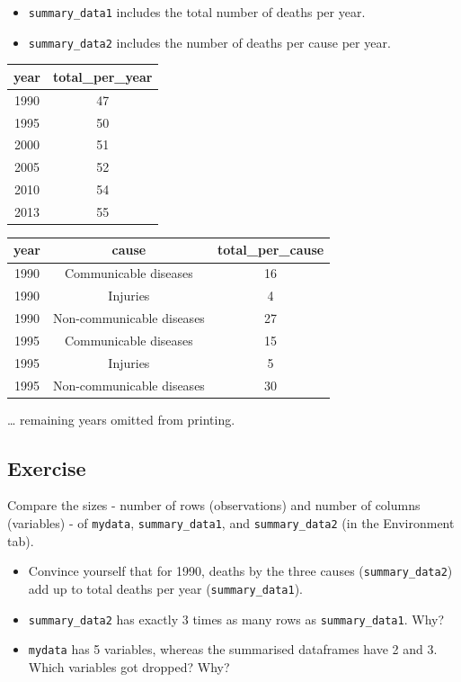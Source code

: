 \documentclass[12pt,]{krantz}
\providecommand{\tightlist}{%
  \setlength{\itemsep}{0pt}\setlength{\parskip}{0pt}}
\theoremstyle{definition}
\theoremstyle{definition}
\theoremstyle{definition}
\theoremstyle{remark}
\begin{document}
\begin{itemize}
\tightlist
\item
  \texttt{summary\_data1} includes the total number of deaths per year.
\item
  \texttt{summary\_data2} includes the number of deaths per cause per
  year.
\end{itemize}

\begin{tabular}{c|c}
\hline
year & total\_per\_year\\
\hline
1990 & 47\\
\hline
1995 & 50\\
\hline
2000 & 51\\
\hline
2005 & 52\\
\hline
2010 & 54\\
\hline
2013 & 55\\
\hline
\end{tabular}

\begin{tabular}{c|c|c}
\hline
year & cause & total\_per\_cause\\
\hline
1990 & Communicable diseases & 16\\
\hline
1990 & Injuries & 4\\
\hline
1990 & Non-communicable diseases & 27\\
\hline
1995 & Communicable diseases & 15\\
\hline
1995 & Injuries & 5\\
\hline
1995 & Non-communicable diseases & 30\\
\hline
\end{tabular}

\ldots{} remaining years omitted from printing.

\hypertarget{exercise-11}{%
\subsection{Exercise}\label{exercise-11}}

Compare the sizes - number of rows (observations) and number of columns
(variables) - of \texttt{mydata}, \texttt{summary\_data1}, and
\texttt{summary\_data2} (in the Environment tab).

\begin{itemize}
\tightlist
\item
  Convince yourself that for 1990, deaths by the three causes
  (\texttt{summary\_data2}) add up to total deaths per year
  (\texttt{summary\_data1}).
\item
  \texttt{summary\_data2} has exactly 3 times as many rows as
  \texttt{summary\_data1}. Why?
\item
  \texttt{mydata} has 5 variables, whereas the summarised dataframes
  have 2 and 3. Which variables got dropped? Why?
\end{itemize}
\end{document}
